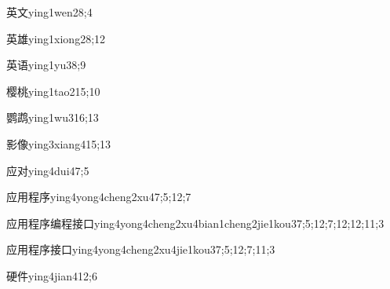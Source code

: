 \begin{verbete}{英文}{ying1wen2}{8;4}
\end{verbete}

\begin{verbete}{英雄}{ying1xiong2}{8;12}
\end{verbete}

\begin{verbete}{英语}{ying1yu3}{8;9}
\end{verbete}

\begin{verbete}{樱桃}{ying1tao2}{15;10}
\end{verbete}

\begin{verbete}{鹦鹉}{ying1wu3}{16;13}
\end{verbete}

\begin{verbete}{影像}{ying3xiang4}{15;13}
\end{verbete}

\begin{verbete}{应对}{ying4dui4}{7;5}
\end{verbete}

\begin{verbete}{应用程序}{ying4yong4cheng2xu4}{7;5;12;7}
\end{verbete}

\begin{verbete}{应用程序编程接口}{ying4yong4cheng2xu4bian1cheng2jie1kou3}{7;5;12;7;12;12;11;3}
\end{verbete}

\begin{verbete}{应用程序接口}{ying4yong4cheng2xu4jie1kou3}{7;5;12;7;11;3}
\end{verbete}

\begin{verbete}{硬件}{ying4jian4}{12;6}
\end{verbete}

